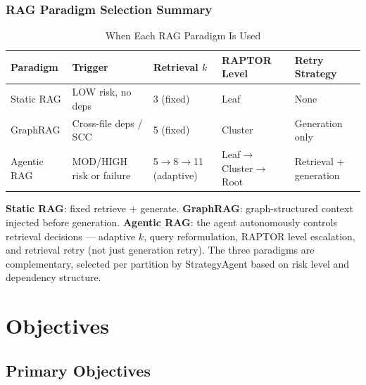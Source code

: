 \documentclass[11pt,a4paper]{article}
\begin{document}
\subsubsection{RAG Paradigm Selection Summary}

\begin{table}[H]
\centering
\caption{When Each RAG Paradigm Is Used}
\renewcommand{\arraystretch}{1.3}
\small
\begin{tabularx}{\textwidth}{@{} l l l l l @{}}
\toprule
\textbf{Paradigm} & \textbf{Trigger} & \textbf{Retrieval $k$} & \textbf{RAPTOR Level} & \textbf{Retry Strategy} \\
\midrule
Static RAG & LOW risk, no deps & 3 (fixed) & Leaf & None \\
GraphRAG & Cross-file deps / SCC & 5 (fixed) & Cluster & Generation only \\
Agentic RAG & MOD/HIGH risk or failure & 5$\to$8$\to$11 (adaptive) & Leaf$\to$Cluster$\to$Root & Retrieval + generation \\
\bottomrule
\end{tabularx}
\end{table}

\begin{infobox}
\textbf{Static RAG}: fixed retrieve $+$ generate. \textbf{GraphRAG}: graph-structured context injected before generation. \textbf{Agentic RAG}: the agent autonomously controls retrieval decisions — adaptive $k$, query reformulation, RAPTOR level escalation, and retrieval retry (not just generation retry). The three paradigms are complementary, selected per partition by StrategyAgent based on risk level and dependency structure.
\end{infobox}


\section{Objectives}

\subsection{Primary Objectives}
\end{document}
